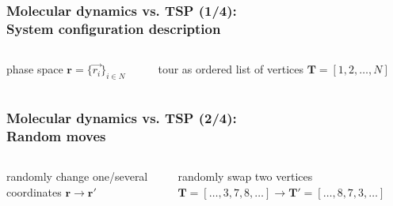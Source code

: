 \documentclass[aspectratio=43]{beamer}
\begin{document}
\begin{frame}
	\frametitle{Molecular dynamics vs. TSP (1/4):\\\alert{System configuration description}}
	\begin{columns}[T]
		\begin{column}{0.5\textwidth}
			\begin{description}
				 \item<1-> phase space $\boldsymbol{r}=\{\vec{r_i}\}_{i \in N}$
			 \end{description}		
		\end{column}
		\begin{column}{0.5\textwidth}
			\begin{description}
				 \item<1-> tour as ordered list of vertices $\boldsymbol{T}=[1, 2, \ldots, N]$
			 \end{description}				
		\end{column}
	\end{columns}
\end{frame}

\begin{frame}
	\frametitle{Molecular dynamics vs. TSP (2/4):\\\alert{Random moves}}
	\begin{columns}[T]
		\begin{column}{0.5\textwidth}
			\begin{description}
				 \item<1-> randomly change one/several coordinates $\boldsymbol{r} \rightarrow \boldsymbol{r}'$
			 \end{description}
		\end{column}	
		\begin{column}{0.5\textwidth}
			\begin{description}
				 \item<1-> randomly swap two vertices $\boldsymbol{T} = [\ldots, 3, 7, 8,\ldots] \rightarrow \boldsymbol{T}'=[\ldots, 8, 7, 3,\ldots]$
			 \end{description}
		\end{column}			
	\end{columns}
\end{frame}
\end{document}
